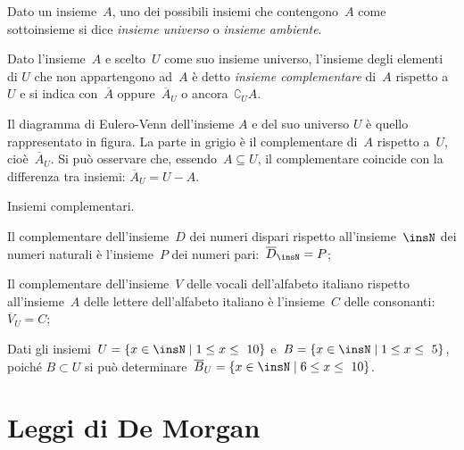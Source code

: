 \begin{definizione}
Dato un insieme~$A$, uno dei possibili insiemi che
contengono~$A$ come sottoinsieme si dice
\emph{insieme universo} o \emph{insieme ambiente}.
\end{definizione}

\begin{definizione}
Dato l'insieme~$A$ e scelto~$U$ come suo insieme universo, l'insieme degli elementi di
$U$ che non appartengono ad~$A$ è detto \emph{insieme complementare} di~$A$ rispetto a~$U$ e si indica con~$\overline{A}$ oppure~$\overline{A}_{U}$
o ancora~$\complement_{U}A$.
\end{definizione}

\begin{multicols}{2}
Il diagramma di Eulero-Venn dell'insieme $A$ e del suo universo $U$ è quello rappresentato in figura.
La parte in grigio è il complementare di~$A$ rispetto a~$U$, cioè~${\overline{A}}_{U}$.
Si può osservare che, essendo~$A\subseteq U$, il complementare coincide con la differenza tra insiemi:
${\overline{A}}_{U}=U-A$.
\begin{center}

\end{center}
\end{multicols}

\begin{exrig}
 \begin{esempio}
 Insiemi complementari.
\begin{enumeratea}
\item Il complementare dell'insieme~$D$ dei numeri dispari rispetto all'insieme~$\insN$ dei numeri naturali è
l'insieme~$P$ dei numeri pari:~${\overline{D}}_{\insN}=P$;
\item Il complementare dell'insieme~$V$ delle vocali dell'alfabeto italiano rispetto
all'insieme~$A$ delle lettere dell'alfabeto italiano è l'insieme~$C$ delle consonanti:
${\overline{V}}_{U}=C$;
\item Dati gli insiemi~$U=\{x\in \insN\mid 1\le x\le~10\}$ e~$B=\{x\in \insN\mid 1\le x\le~5\}$, poiché $B\subset U$
si può determinare~${\overline{B}}_{U}=\{x\in \insN\mid 6\le x\le~10\}$.
\end{enumeratea}
 \end{esempio}
\end{exrig}

\ovalbox{\risolvii \ref{ese:7.23}, \ref{ese:7.24}, \ref{ese:7.25}, \ref{ese:7.26}, \ref{ese:7.27}}

\section{Leggi di De Morgan}

